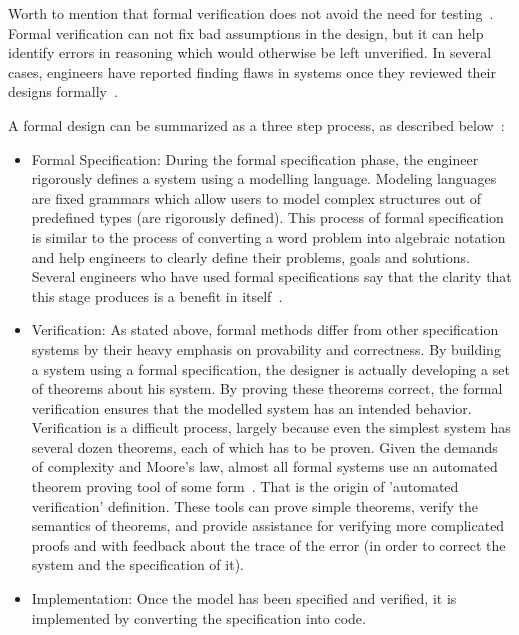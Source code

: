 Worth to mention that formal verification does not avoid the need for testing~\cite{Bowen95}. Formal verification can not fix bad assumptions in the design, but it can help identify errors in reasoning which would otherwise be left unverified. In several cases, engineers have reported finding flaws in systems once they reviewed their designs formally~\cite{Kling95}.

A formal design can be summarized as a three step process, as described below~\cite{Collins98}:

\begin{itemize}
\item Formal Specification: During the formal specification phase, the engineer rigorously defines a system using a modelling language. Modeling languages are fixed grammars which allow users to model complex structures out of predefined types (are rigorously defined). This process of formal specification is similar to the process of converting a word problem into algebraic notation and help engineers to clearly define their problems, goals and solutions. Several engineers who have used formal specifications say that the clarity that this stage produces is a benefit in itself~\cite{Kling95}.
\item Verification: As stated above, formal methods differ from other specification systems by their heavy emphasis on provability and correctness. By building a system using a formal specification, the designer is actually developing a set of theorems about his system. By proving these theorems correct, the formal verification ensures that the modelled system has an intended behavior. Verification is a difficult process, largely because even the simplest system has several dozen theorems, each of which has to be proven. Given the demands of complexity and Moore's law, almost all formal systems use an automated theorem proving tool of some form~\cite{Collins98}. That is the origin of 'automated verification' definition. These tools can prove simple theorems, verify the semantics of theorems, and provide assistance for verifying more complicated proofs and with feedback about the trace of the error (in order to correct the system and the specification of it).
\item Implementation: Once the model has been specified and verified, it is implemented by converting the specification into code.

\end{itemize}

